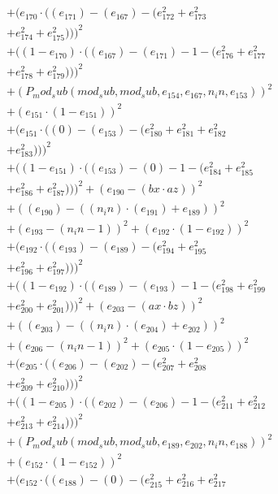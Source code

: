 \documentclass[10pt, a4paper]{article}
\begin{document}
\begin{align*}
& + (e_{170}  \cdot  ((e_{171}) - (e_{167}) - (e_{172}^{2} + e_{173}^{2} \\
& + e_{174}^{2} + e_{175}^{2})))^{2} \\
& + ((1 - e_{170})  \cdot  ((e_{167}) - (e_{171}) - 1 - (e_{176}^{2} + e_{177}^{2} \\
& + e_{178}^{2} + e_{179}^{2})))^{2} \\
& + (P_mod_sub(mod_sub, mod_sub, e_{154}, e_{167}, n_in, e_{153}))^{2} \\
& + (e_{151}  \cdot  (1 - e_{151}))^{2} \\
& + (e_{151}  \cdot  ((0) - (e_{153}) - (e_{180}^{2} + e_{181}^{2} + e_{182}^{2} \\
& + e_{183}^{2})))^{2} \\
& + ((1 - e_{151})  \cdot  ((e_{153}) - (0) - 1 - (e_{184}^{2} + e_{185}^{2} \\
& + e_{186}^{2} + e_{187}^{2})))^{2} + (e_{190} - (bx  \cdot  az))^{2} \\
& + ((e_{190}) - ((n_in)  \cdot  (e_{191}) + e_{189}))^{2} \\
& + (e_{193} - (n_in - 1))^{2} + (e_{192}  \cdot  (1 - e_{192}))^{2} \\
& + (e_{192}  \cdot  ((e_{193}) - (e_{189}) - (e_{194}^{2} + e_{195}^{2} \\
& + e_{196}^{2} + e_{197}^{2})))^{2} \\
& + ((1 - e_{192})  \cdot  ((e_{189}) - (e_{193}) - 1 - (e_{198}^{2} + e_{199}^{2} \\
& + e_{200}^{2} + e_{201}^{2})))^{2} + (e_{203} - (ax  \cdot  bz))^{2} \\
& + ((e_{203}) - ((n_in)  \cdot  (e_{204}) + e_{202}))^{2} \\
& + (e_{206} - (n_in - 1))^{2} + (e_{205}  \cdot  (1 - e_{205}))^{2} \\
& + (e_{205}  \cdot  ((e_{206}) - (e_{202}) - (e_{207}^{2} + e_{208}^{2} \\
& + e_{209}^{2} + e_{210}^{2})))^{2} \\
& + ((1 - e_{205})  \cdot  ((e_{202}) - (e_{206}) - 1 - (e_{211}^{2} + e_{212}^{2} \\
& + e_{213}^{2} + e_{214}^{2})))^{2} \\
& + (P_mod_sub(mod_sub, mod_sub, e_{189}, e_{202}, n_in, e_{188}))^{2} \\
& + (e_{152}  \cdot  (1 - e_{152}))^{2} \\
& + (e_{152}  \cdot  ((e_{188}) - (0) - (e_{215}^{2} + e_{216}^{2} + e_{217}^{2} \\

\end{align*}
\end{document}
